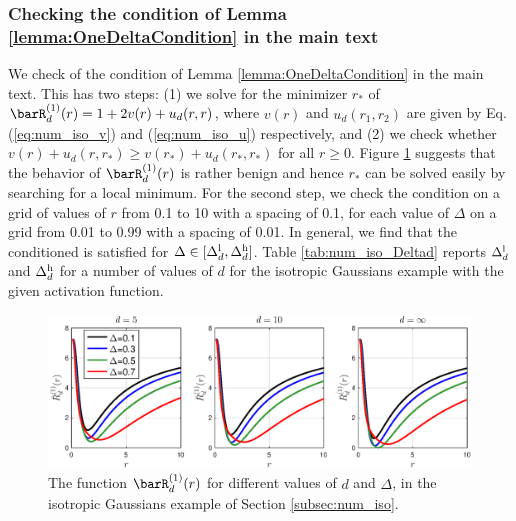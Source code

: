 \documentclass[11pt]{article}
\begin{document}
\subsubsection{Checking the condition of Lemma \ref{lemma:OneDeltaCondition} in the main text}\label{subsubsec:num_iso_Lemma1}
We check of the condition of Lemma  \ref{lemma:OneDeltaCondition}  in the main text. This has two steps: (1) we solve for the minimizer $r_*$ of $\barR_d^{(1)}(r) = 1+2v(r)+u_d(r,r)$, where $v(r)$ and $u_d(r_1,r_2)$ are given by Eq. (\ref{eq:num_iso_v}) and (\ref{eq:num_iso_u}) respectively, and (2) we check whether $v(r)+u_d(r,r_*)\geq v(r_*)+u_d(r_*,r_*)$ for all $r\geq 0$. Figure \ref{fig:num_iso_riskSingleDelta} suggests that the behavior of $\barR_d^{(1)}(r)$ is rather benign and hence $r_*$ can be solved easily by searching for a local minimum. For the second step, we check the condition on a grid of values of $r$ from 0.1 to 10 with a spacing of 0.1, for each value of $\Delta$ on a grid from 0.01 to 0.99 with a spacing of 0.01. In general, we find that the conditioned is satisfied for $\Delta\in[\Delta_d^{\rm l}, \Delta_d^{\rm h}]$. Table \ref{tab:num_iso_Deltad} reports $\Delta_d^{\rm l}$ and $\Delta_d^{\rm h}$ for a number of values of $d$ for the isotropic Gaussians example with the given activation function.

\begin{figure}[]
	\begin{center}
		\includegraphics[width=1.0\textwidth]{isotropic_risk_singleDelta.eps}
	\end{center}
	\caption{The function $\barR_d^{(1)}(r)$ for different values of $d$ and $\Delta$, in the isotropic Gaussians example of Section \ref{subsec:num_iso}.}
	\label{fig:num_iso_riskSingleDelta}
\end{figure}
\end{document}
